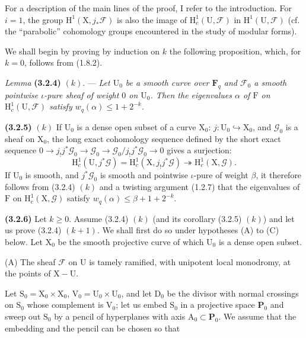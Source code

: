 \documentclass[11pt,leqno]{article}
\begin{document}
For a description of the main lines of the proof, I refer to the introduction. For \(i=1\), the group \(\mathrm{H}^1(\mathrm{X},j_*\mathscr{F})\) is also the image of \(\mathrm{H}_c^1(\mathrm{U},\mathscr{F})\) in \(\mathrm{H}^1(\mathrm{U},\mathscr{F})\) (cf. the “parabolic” cohomology groups encountered in the study of modular forms).

We shall begin by proving by induction on \(k\) the following proposition, which, for \(k=0\), follows from (1.8.2).

\textit{Lemma} \textbf{(3.2.4)} \((k)\). — \textit{Let \(\mathrm{U}_0\) be a smooth curve over \(\mathbf{F}_q\) and \(\mathscr{F}_0\) a smooth pointwise \(\iota\)-pure sheaf of weight \(0\) on \(\mathrm{U}_0\). Then the eigenvalues \(\alpha\) of \(\mathrm{F}\) on \(\mathrm{H}_c^1(\mathrm{U},\mathscr{F})\) satisfy \(w_q(\alpha)\leq 1+2^{-k}\).}

\textbf{(3.2.5)} \((k)\) If \(\mathrm{U}_0\) is a dense open subset of a curve \(\mathrm{X}_0\): \(j:\mathrm{U}_0\hookrightarrow\mathrm{X}_0\), and \(\mathscr{G}_0\) is a sheaf on \(\mathrm{X}_0\), the long exact cohomology sequence defined by the short exact sequence \(0\to j_!j^*\mathscr{G}_0\to\mathscr{G}_0\to\mathscr{G}_0/j_!j^*\mathscr{G}_0\to0\) gives a surjection:
\[
\mathrm{H}_c^1(\mathrm{U},j^*\mathscr{G})
=\mathrm{H}_c^1(\mathrm{X},j_!j^*\mathscr{G})
\twoheadrightarrow\mathrm{H}_c^1(\mathrm{X},\mathscr{G}).
\]
If \(\mathrm{U}_0\) is smooth, and \(j^*\mathscr{G}_0\) is smooth and pointwise \(\iota\)-pure of weight \(\beta\), it therefore follows from (3.2.4) \((k)\) and a twisting argument (1.2.7) that the eigenvalues of \(\mathrm{F}\) on \(\mathrm{H}_c^1(\mathrm{X},\mathscr{G})\) satisfy \(w_q(\alpha)\leq\beta+1+2^{-k}\).

\textbf{(3.2.6)} Let \(k\geq0\). Assume (3.2.4) \((k)\) (and its corollary (3.2.5) \((k)\)) and let us prove (3.2.4) \((k+1)\). We shall first do so under hypotheses (A) to (C) below. Let \(\mathrm{X}_0\) be the smooth projective curve of which \(\mathrm{U}_0\) is a dense open subset.

(A) The sheaf \(\mathscr{F}\) on \(\mathrm{U}\) is tamely ramified, with unipotent local monodromy, at the points of \(\mathrm{X}-\mathrm{U}\).

Let \(\mathrm{S}_0=\mathrm{X}_0\times\mathrm{X}_0\), \(\mathrm{V}_0=\mathrm{U}_0\times\mathrm{U}_0\), and let \(\mathrm{D}_0\) be the divisor with normal crossings on \(\mathrm{S}_0\) whose complement is \(\mathrm{V}_0\); let us embed \(\mathrm{S}_0\) in a projective space \(\mathbf{P}_0\) and sweep out \(\mathrm{S}_0\) by a pencil of hyperplanes with axis \(\mathrm{A}_0\subset\mathbf{P}_0\). We assume that the embedding and the pencil can be chosen so that
\end{document}
